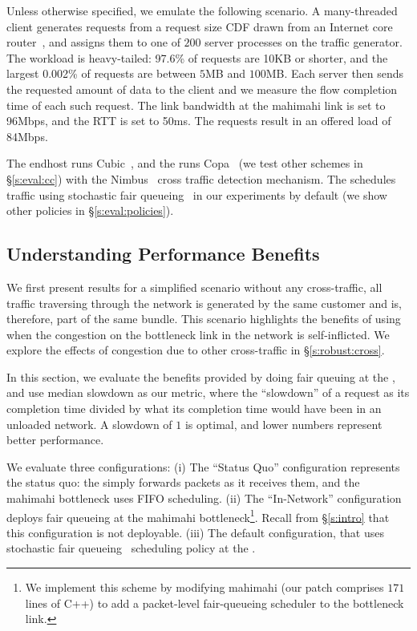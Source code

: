 Unless otherwise specified, we emulate the following scenario.
A many-threaded client generates requests from a request size CDF drawn from an Internet core router~\cite{caida-dataset}, and assigns them to one of $200$ server processes on the traffic generator.
The workload is heavy-tailed: 97.6\% of requests are 10KB or shorter, and the largest 0.002\% of requests are between $5$MB and $100$MB.
Each server then sends the requested amount of data to the client and we measure the flow completion time of each such request. 
The link bandwidth at the mahimahi link is set to 96Mbps, and the RTT is set to 50ms. The requests result in an offered load of 84Mbps. 

The endhost runs Cubic~\cite{cubic}, and the \inbox runs Copa~\cite{copa} (we test other schemes in \S\ref{s:eval:cc}) with the Nimbus~\cite{nimbus} cross traffic detection mechanism. The \inbox schedules traffic using stochastic fair queueing~\cite{sfq} in our experiments by default (we show other policies in \S\ref{s:eval:policies}). 

\subsection{Understanding Performance Benefits}\label{s:eval:fct}

We first present results for a simplified scenario without any cross-traffic, \ie all traffic traversing through the network is generated by the same customer and is, therefore, part of the same bundle. 
This scenario highlights the benefits of using \name when the congestion on the bottleneck link in the network is self-inflicted. We explore the effects of congestion due to other cross-traffic in \S\ref{s:robust:cross}.


\newcommand{\baseline}{Status Quo\xspace}
\newcommand{\optimal}{In-Network\xspace}

In this section, we evaluate the benefits provided by doing fair queuing at the \name, and use median slowdown as our metric, where the ``slowdown'' of a request as its completion time divided by what its completion time would have been in an unloaded network. A slowdown of $1$ is optimal, and lower numbers represent better performance.

We evaluate three configurations: 
(i) The ``\baseline'' configuration represents the status quo: the \inbox simply forwards packets as it receives them, and the mahimahi bottleneck uses FIFO scheduling.
(ii) The ``\optimal'' configuration deploys fair queueing
at the mahimahi bottleneck\footnote{
We implement this scheme by modifying mahimahi (our patch comprises $171$ lines of C++) to add a packet-level fair-queueing scheduler to the bottleneck link.}. 
Recall from \S\ref{s:intro} that this configuration is not deployable.
(iii) The default \name configuration, that uses stochastic fair queueing~\cite{sfq} scheduling policy at the \inbox.

